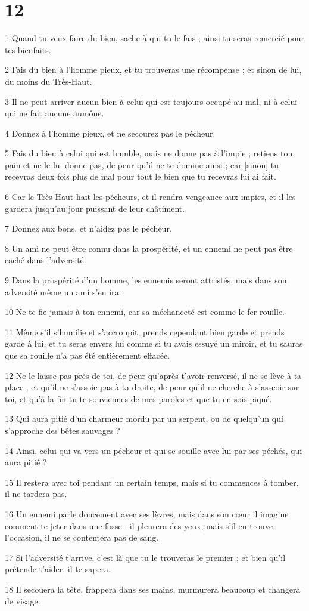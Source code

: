 \chapter{12}

\par 1 Quand tu veux faire du bien, sache à qui tu le fais ; ainsi tu seras remercié pour tes bienfaits.
\par 2 Fais du bien à l'homme pieux, et tu trouveras une récompense ; et sinon de lui, du moins du Très-Haut.
\par 3 Il ne peut arriver aucun bien à celui qui est toujours occupé au mal, ni à celui qui ne fait aucune aumône.
\par 4 Donnez à l'homme pieux, et ne secourez pas le pécheur.
\par 5 Fais du bien à celui qui est humble, mais ne donne pas à l'impie ; retiens ton pain et ne le lui donne pas, de peur qu'il ne te domine ainsi ; car [sinon] tu recevras deux fois plus de mal pour tout le bien que tu recevras lui ai fait.
\par 6 Car le Très-Haut hait les pécheurs, et il rendra vengeance aux impies, et il les gardera jusqu'au jour puissant de leur châtiment.
\par 7 Donnez aux bons, et n'aidez pas le pécheur.
\par 8 Un ami ne peut être connu dans la prospérité, et un ennemi ne peut pas être caché dans l'adversité.
\par 9 Dans la prospérité d'un homme, les ennemis seront attristés, mais dans son adversité même un ami s'en ira.
\par 10 Ne te fie jamais à ton ennemi, car sa méchanceté est comme le fer rouille.
\par 11 Même s'il s'humilie et s'accroupit, prends cependant bien garde et prends garde à lui, et tu seras envers lui comme si tu avais essuyé un miroir, et tu sauras que sa rouille n'a pas été entièrement effacée.
\par 12 Ne le laisse pas près de toi, de peur qu'après t'avoir renversé, il ne se lève à ta place ; et qu'il ne s'assoie pas à ta droite, de peur qu'il ne cherche à s'asseoir sur toi, et qu'à la fin tu te souviennes de mes paroles et que tu en sois piqué.
\par 13 Qui aura pitié d'un charmeur mordu par un serpent, ou de quelqu'un qui s'approche des bêtes sauvages ?
\par 14 Ainsi, celui qui va vers un pécheur et qui se souille avec lui par ses péchés, qui aura pitié ?
\par 15 Il restera avec toi pendant un certain temps, mais si tu commences à tomber, il ne tardera pas.
\par 16 Un ennemi parle doucement avec ses lèvres, mais dans son cœur il imagine comment te jeter dans une fosse : il pleurera des yeux, mais s'il en trouve l'occasion, il ne se contentera pas de sang.
\par 17 Si l'adversité t'arrive, c'est là que tu le trouveras le premier ; et bien qu'il prétende t'aider, il te sapera.
\par 18 Il secouera la tête, frappera dans ses mains, murmurera beaucoup et changera de visage.

